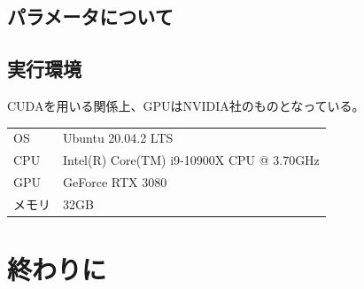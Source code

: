 \documentclass[10pt, a4paper]{jsarticle}
\begin{document}
\subsection{パラメータについて}
\subsection{実行環境}
CUDAを用いる関係上、GPUはNVIDIA社のものとなっている。
\begin{table}[h]
    \begin{center}
        \begin{tabular}{ll}
            OS & Ubuntu 20.04.2 LTS \\
            CPU & Intel(R) Core(TM) i9-10900X CPU @ 3.70GHz \\
            GPU & GeForce RTX 3080 \\
            メモリ & 32GB \\
        \end{tabular}
    \end{center}
\end{table}
\section{終わりに}
\end{document}
